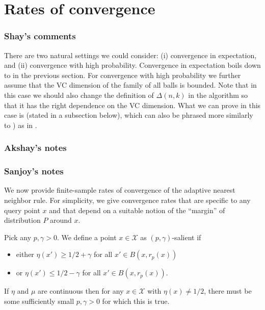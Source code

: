 \documentclass{article}
\def\X{{\mathcal X}}
\newcommand{\comment}[3]{}  %
\newcommand{\akshay}[1]{\comment{blue}{Akshay}{#1}}
\begin{document}
\section{Rates of convergence}


\subsubsection{Shay's comments}

There are two natural settings we could consider: (i) convergence in expectation, and (ii) convergence with high probability.
Convergence in expectation boils down to  in the previous section.
For convergence with high probability we further assume that the VC dimension of the family of all balls is bounded. 
Note that in this case we should also change the definition of $\Delta(n,k)$  in the algorithm so that it has the right dependence on the VC dimension. \akshay{It's already correct in the initial definition of the algorithm, but not consistent in the definitions of $\X^{\pm}_n$.} What we can prove in this case is  (stated in a subsection below), 
which can also be phrased more similarly to ) as in .



\subsubsection{Akshay's notes}


\subsubsection{Sanjoy's notes}
We now provide finite-sample rates of convergence of the adaptive nearest neighbor rule. For simplicity, we give convergence rates that are specific to any query point $x$ and that depend on a suitable notion of the ``margin'' of distribution $P$ around $x$.

Pick any $p, \gamma > 0$. We define a point $x \in \X$ as $(p, \gamma)$-salient if 
\begin{itemize}
\item either $\eta(x') \geq 1/2 + \gamma$ for all $x' \in B(x, r_p(x))$
\item or $\eta(x') \leq 1/2 - \gamma$ for all $x' \in B(x, r_p(x))$.
\end{itemize}
If $\eta$ and $\mu$ are continuous then for any $x \in \X$ with $\eta(x) \neq 1/2$, there must be some sufficiently small $p, \gamma > 0$ for which this is true.
\end{document}
